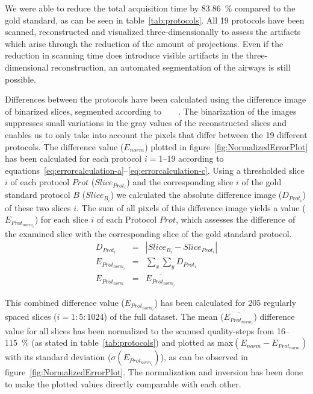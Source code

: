 We were able to reduce the total acquisition time by \SI{83.86}{\percent} compared to the gold standard, as can be seen in table~\ref{tab:protocols}. All 19 protocols have been scanned, reconstructed and visualized three-dimensionally to assess the artifacts which arise through the reduction of the amount of projections. Even if the reduction in scanning time does introduce visible artifacts in the three-dimensional reconstruction, an automated segmentation of the airways is still possible.

Differences between the protocols have been calculated using the difference image of binarized slices, segmented according to%
\ifhtml
	~\citet{Otsu1979}
\else
	~
\fi%
. The binarization of the images suppresses small variations in the gray values of the reconstructed slices and enables us to only take into account the pixels that differ between the 19 different protocols. The difference value ($E_{norm}$) plotted in figure~\ref{fig:NormalizedErrorPlot} has been calculated for each protocol $i=$1--19 according to equations~\ref{eq:errorcalculation-a}--\ref{eq:errorcalculation-c}. Using a thresholded slice $i$ of each protocol $Prot$ ($Slice_{Prot_{i}}$) and the corresponding slice $i$ of the gold standard protocol $B$ ($Slice_{B_{i}}$) we calculated the absolute difference image ($D_{Prot_{i}}$) of these two slices $i$. The sum of all pixels of this difference image yields a value ($E_{Prot_{norm_{i}}}$) for each slice $i$ of each Protocol $Prot$, which assesses the difference of the examined slice with the corresponding slice of the gold standard protocol.
\begin{eqnarray}%
	D_{Prot_{i}} &=& |Slice_{B_{i}}-Slice_{Prot_{i}}|\label{eq:errorcalculation-a}\\%
	E_{Prot_{norm_{i}}} &=& \sum_{x}\sum_{y} D_{Prot_{i}}\label{eq:errorcalculation-b}\\%
	E_{Prot_{norm}} &=& \overline{E_{Prot_{norm_{i}}}}\label{eq:errorcalculation-c}%
\end{eqnarray}%

This combined difference value ($E_{Prot_{norm_{i}}}$) has been calculated for 205 regularly spaced slices ($i=1:5:1024$) of the full dataset. The mean ($\overline{E_{Prot_{norm_{i}}}}$) difference value for all slices has been normalized to the scanned quality-steps from 16--\SI{115}{\percent} (as stated in table~\ref{tab:protocols}) and plotted as max$(E_{norm}-E_{Prot_{norm}})$ with its standard deviation ($\sigma(E_{Prot_{norm_{i}}})$), as can be observed in figure~\ref{fig:NormalizedErrorPlot}. The normalization and inversion has been done to make the plotted values directly comparable with each other.


